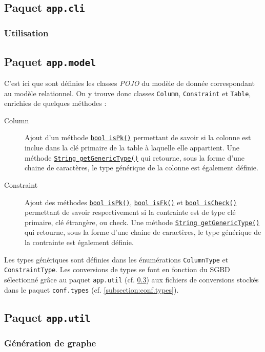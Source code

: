 \subsection{Paquet \texttt{app.cli}}
\subsubsection{Utilisation}

\subsection{Paquet \texttt{app.model}}
C'est ici que sont définies les classes \emph{POJO} du modèle de donnée correspondant au modèle relationnel. On y trouve donc classes \texttt{Column}, \texttt{Constraint} et \texttt{Table}, enrichies de quelques méthodes :

\begin{description}

\item[Column] Ajout d'un méthode \texttt{\underline{bool isPk()}} permettant de savoir si la colonne est inclue dans la clé primaire de la table à laquelle elle appartient. Une méthode \texttt{\underline{String getGenericType()}} qui retourne, sous la forme d'une chaine de caractères, le type générique de la colonne est également définie.

\item[Constraint] Ajout des méthodes \texttt{\underline{bool isPk()}}, \texttt{\underline{bool isFk()}} et \texttt{\underline{bool isCheck()}} permettant de savoir respectivement si la contrainte est de type clé primaire, clé étrangère, ou check. Une méthode \texttt{\underline{String getGenericType()}} qui retourne, sous la forme d'une chaine de caractères, le type générique de la contrainte est également définie.
\end{description}

Les types génériques sont définies dans les énumérations \texttt{ColumnType} et \texttt{ConstraintType}. Les conversions de types se font en fonction du SGBD sélectionné grâce au paquet \texttt{app.util} (cf. \ref{subsection:app.util}) aux fichiers de conversions stockés dans le paquet \texttt{conf.types} (cf. \ref{subsection:conf.types}).

\subsection{Paquet \texttt{app.util}}
\label{subsection:app.util}
\subsubsection{Génération de graphe}

